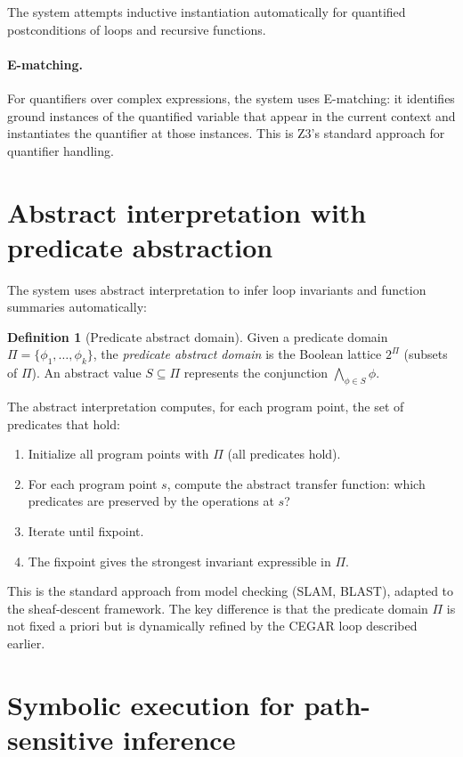 \documentclass[11pt]{report}
\theoremstyle{definition}
\newtheorem{definition}{Definition}[section]
\theoremstyle{plain}
\begin{document}
The system attempts inductive instantiation automatically for quantified
postconditions of loops and recursive functions.

\paragraph{E-matching.}
For quantifiers over complex expressions, the system uses E-matching: it
identifies ground instances of the quantified variable that appear in the
current context and instantiates the quantifier at those instances. This is
Z3's standard approach for quantifier handling.

\section{Abstract interpretation with predicate abstraction}

The system uses abstract interpretation to infer loop invariants and
function summaries automatically:

\begin{definition}[Predicate abstract domain]
Given a predicate domain $\Pi = \{\phi_1, \ldots, \phi_k\}$, the
\emph{predicate abstract domain} is the Boolean lattice $2^\Pi$ (subsets of
$\Pi$). An abstract value $S \subseteq \Pi$ represents the conjunction
$\bigwedge_{\phi \in S} \phi$.
\end{definition}

The abstract interpretation computes, for each program point, the set of
predicates that hold:
\begin{enumerate}[nosep]
  \item Initialize all program points with $\Pi$ (all predicates hold).
  \item For each program point $s$, compute the abstract transfer function:
        which predicates are preserved by the operations at $s$?
  \item Iterate until fixpoint.
  \item The fixpoint gives the strongest invariant expressible in $\Pi$.
\end{enumerate}

This is the standard approach from model checking (SLAM, BLAST), adapted to
the sheaf-descent framework. The key difference is that the predicate domain
$\Pi$ is not fixed a priori but is dynamically refined by the CEGAR loop
described earlier.

\section{Symbolic execution for path-sensitive inference}
\end{document}

